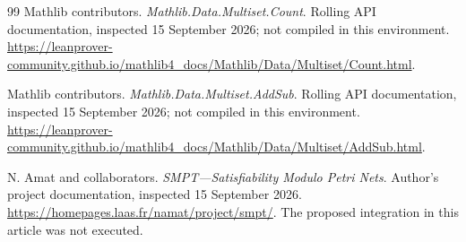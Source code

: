 \begin{thebibliography}{99}
Mathlib contributors.
\emph{Mathlib.Data.Multiset.Count}.
Rolling API documentation, inspected 15 September 2026; not compiled in this environment.
\url{https://leanprover-community.github.io/mathlib4_docs/Mathlib/Data/Multiset/Count.html}.

Mathlib contributors.
\emph{Mathlib.Data.Multiset.AddSub}.
Rolling API documentation, inspected 15 September 2026; not compiled in this environment.
\url{https://leanprover-community.github.io/mathlib4_docs/Mathlib/Data/Multiset/AddSub.html}.

N. Amat and collaborators.
\emph{SMPT---Satisfiability Modulo Petri Nets}.
Author's project documentation, inspected 15 September 2026.
\url{https://homepages.laas.fr/namat/project/smpt/}.
The proposed integration in this article was not executed.
\end{thebibliography}

